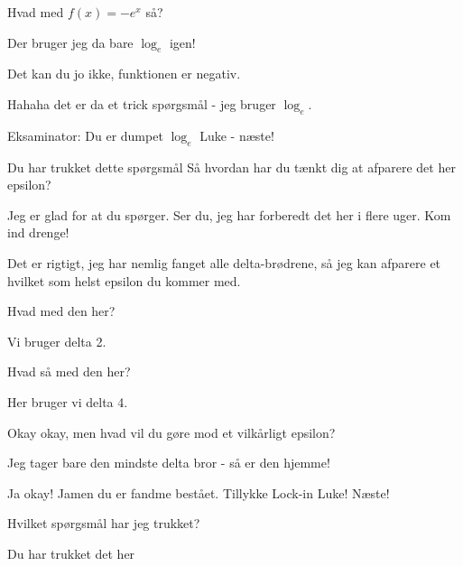 \documentclass[a4paper,11pt]{article}
\begin{document}
\begin{sketch}
 Hvad med $f(x)=-e^x$ så?

 Der bruger jeg da bare $\log_e$ igen!

 Det kan du jo ikke, funktionen er negativ.

 Hahaha det er da et trick spørgsmål - jeg bruger $\log_e$.

 Eksaminator: Du er dumpet $\log_e$ Luke - næste!


 Du har trukket dette spørgsmål  Så hvordan har du tænkt dig at afparere det her epsilon?

 Jeg er glad for at du spørger. Ser du, jeg har forberedt det her i flere uger. Kom ind drenge!


 Det er rigtigt, jeg har nemlig fanget alle delta-brødrene, så jeg kan afparere et hvilket som helst epsilon du kommer med.

 Hvad med den her?

 Vi bruger delta 2.

 Hvad så med den her?

 Her bruger vi delta 4.

 Okay okay, men hvad vil du gøre mod et vilkårligt epsilon?

 Jeg tager bare den mindste delta bror - så er den hjemme!

 Ja okay! Jamen du er fandme bestået. Tillykke Lock-in Luke! Næste!


 Hvilket spørgsmål har jeg trukket?

 Du har trukket det her 

\end{sketch}
\end{document}
